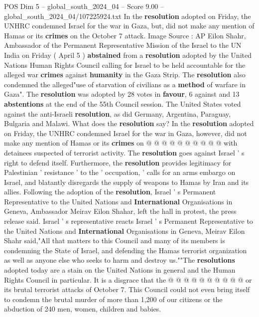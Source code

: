\begin{textsample}{POS Dim 5 – global\_south\_2024\_04 – Score 9.00 – global\_south\_2024\_04/107225924.txt}  \label{ex:f5_pos_280}
In the \textbf{resolution} adopted on Friday, the UNHRC condemned Israel for the war in Gaza, but, did not make any mention of Hamas or its \textbf{crimes} on the October 7 attack.
Image Source : AP Eilon Shahr, Ambassador of the Permanent Representative Mission of the Israel to the UN India on Friday ( April 5 ) \textbf{abstained} from a \textbf{resolution} adopted by the United Nations Human Rights Council calling for Israel to be held accountable for the alleged war \textbf{crimes} against \textbf{humanity} in the Gaza Strip.
The \textbf{resolution} also condemned the alleged"use of starvation of civilians as a \textbf{method} of warfare in Gaza".
The \textbf{resolution} was adopted by 28 votes in \textbf{favour}, 6 against and 13 \textbf{abstentions} at the end of the 55th Council session.
The United States voted against the anti-Israeli \textbf{resolution}, as did Germany, Argentina, Paraguay, Bulgaria and Malawi.
What does the \textbf{resolution} say?
In the \textbf{resolution} adopted on Friday, the UNHRC condemned Israel for the war in Gaza, however, did not make any mention of Hamas or its \textbf{crimes} on @ @ @ @ @ @ @ @ @ @ with detainees suspected of terrorist activity.
The \textbf{resolution} goes against Israel ' s right to defend itself.
Furthermore, the \textbf{resolution} provides legitimacy for Palestinian ' resistance ' to the ' occupation, ' calls for an arms embargo on Israel, and blatantly disregards the supply of weapons to Hamas by Iran and its allies.
Following the adoption of the \textbf{resolution}, Israel ' s Permanent Representative to the United Nations and \textbf{International} Organisations in Geneva, Ambassador Meirav Eilon Shahar, left the hall in protest, the press release said.
Israel ' s representative reacts Israel ' s Permanent Representative to the United Nations and \textbf{International} Organisations in Geneva, Meirav Eilon Shahr said,"All that matters to this Council and many of its members is condemning the State of Israel, and defending the Hamas terrorist organization as well as anyone else who seeks to harm and destroy us.""The \textbf{resolutions} adopted today are a stain on the United Nations in general and the Human Rights Council in particular.
It is a disgrace that the @ @ @ @ @ @ @ @ @ @ or its brutal terrorist attacks of October 7.
This Council could not even bring itself to condemn the brutal murder of more than 1,200 of our citizens or the abduction of 240 men, women, children and babies.

\end{textsample}
